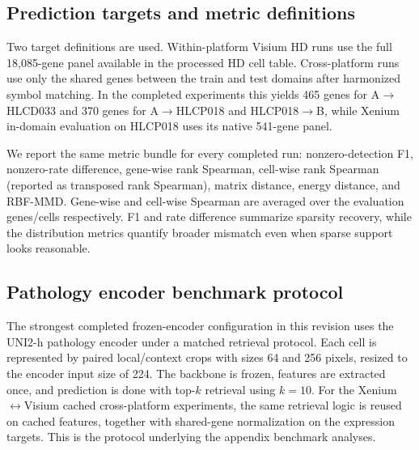 \documentclass{article}
\begin{document}
\subsection{Prediction targets and metric definitions}
Two target definitions are used. Within-platform Visium HD runs use the full 18,085-gene panel available in the processed HD cell table. Cross-platform runs use only the shared genes between the train and test domains after harmonized symbol matching. In the completed experiments this yields 465 genes for A$\!\rightarrow\!$HLCD033 and 370 genes for A$\!\rightarrow\!$HLCP018 and HLCP018$\!\rightarrow\!$B, while Xenium in-domain evaluation on HLCP018 uses its native 541-gene panel.

We report the same metric bundle for every completed run: nonzero-detection F1, nonzero-rate difference, gene-wise rank Spearman, cell-wise rank Spearman (reported as transposed rank Spearman), matrix distance, energy distance, and RBF-MMD. Gene-wise and cell-wise Spearman are averaged over the evaluation genes/cells respectively. F1 and rate difference summarize sparsity recovery, while the distribution metrics quantify broader mismatch even when sparse support looks reasonable.

\subsection{Pathology encoder benchmark protocol}
The strongest completed frozen-encoder configuration in this revision uses the UNI2-h pathology encoder under a matched retrieval protocol. Each cell is represented by paired local/context crops with sizes 64 and 256 pixels, resized to the encoder input size of 224. The backbone is frozen, features are extracted once, and prediction is done with top-$k$ retrieval using $k=10$. For the Xenium$\leftrightarrow$Visium cached cross-platform experiments, the same retrieval logic is reused on cached features, together with shared-gene normalization on the expression targets. This is the protocol underlying the appendix benchmark analyses.
\end{document}
